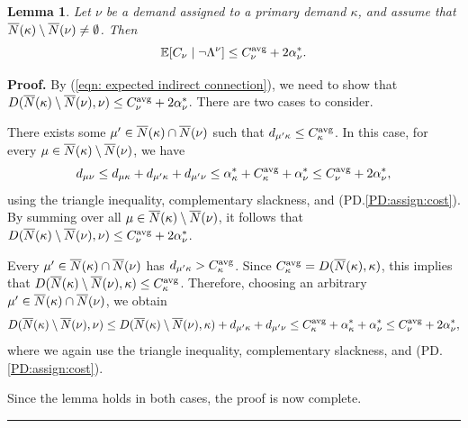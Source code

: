 \documentclass[oneside,final]{ucr}
\newtheorem{lemma}[theorem]{Lemma}
\newenvironment{proof}[1][Proof]{\textbf{#1.} }{\ \rule{0.5em}{0.5em}}
\begin{document}
\begin{lemma}
  \label{lem:echu indirect}
  Let $\nu$ be a demand assigned to a primary demand $\kappa$, and
assume that ${\overline{N}}(\kappa) \setminus {\overline{N}}(\nu)\neq\emptyset$.
Then 
%
\begin{equation*}
	\mathbb{E}[ C_\nu \mid\neg\Lambda^\nu]  \leq
  		C^{{\mbox{\scriptsize\rm avg}}}_\nu+2\alpha_{\nu}^\ast.
\end{equation*}
\end{lemma}
\begin{proof}
By (\ref{eqn: expected indirect connection}), we need to show that $D({\overline{N}}(\kappa)
  \setminus {\overline{N}}(\nu), \nu) \leq C^{{\mbox{\scriptsize\rm avg}}}_\nu +
  2\alpha_{\nu}^\ast$. There are two cases to consider.

\begin{description}
%	
\item{}
	 There exists some $\mu'\in {\overline{N}}(\kappa) \cap
  {\overline{N}}(\nu)$ such that $d_{\mu' \kappa} \leq C^{{\mbox{\scriptsize\rm avg}}}_\kappa$.
In this case, for every $\mu\in {\overline{N}}(\kappa)\setminus {\overline{N}}(\nu)$, we have
%
\begin{equation*}
d_{\mu \nu} \leq d_{\mu \kappa} + d_{\mu' \kappa} + d_{\mu' \nu}  
 	\le  \alpha^\ast_\kappa + C^{{\mbox{\scriptsize\rm avg}}}_\kappa + \alpha^\ast_{\nu}
  \leq C^{{\mbox{\scriptsize\rm avg}}}_\nu + 2\alpha_{\nu}^\ast,
\end{equation*}
%
using the triangle inequality, complementary slackness, and (PD.\ref{PD:assign:cost}).
By summing over all $\mu\in {\overline{N}}(\kappa) \setminus {\overline{N}}(\nu)$, it
follows that $D({\overline{N}}(\kappa) \setminus {\overline{N}}(\nu), \nu) \leq
C^{{\mbox{\scriptsize\rm avg}}}_\nu + 2\alpha_{\nu}^\ast$.

\item{}
 Every $\mu'\in {\overline{N}}(\kappa)\cap {\overline{N}}(\nu)$
has $d_{\mu'\kappa} > C^{{\mbox{\scriptsize\rm avg}}}_\kappa$. Since $C^{{\mbox{\scriptsize\rm avg}}}_{\kappa} = D({\overline{N}}(\kappa),\kappa)$,
this implies that
$D({\overline{N}}(\kappa) \setminus {\overline{N}}(\nu),\kappa)\leq C^{{\mbox{\scriptsize\rm avg}}}_{\kappa}$. Therefore,
choosing an arbitrary $\mu'\in {\overline{N}}(\kappa)\cap {\overline{N}}(\nu)$,
we obtain
%
\begin{equation*}
  D({\overline{N}}(\kappa) \setminus {\overline{N}}(\nu), \nu) 
	\leq  D({\overline{N}}(\kappa) \setminus {\overline{N}}(\nu), \kappa) 
			+ d_{\mu' \kappa} + d_{\mu' \nu} 
	\leq  C^{{\mbox{\scriptsize\rm avg}}}_{\kappa} +
  \alpha_{\kappa}^\ast + \alpha_{\nu}^\ast
	\leq C^{{\mbox{\scriptsize\rm avg}}}_\nu + 2\alpha_{\nu}^\ast,
\end{equation*}
%
where we again use the triangle inequality,
complementary slackness, and  (PD.\ref{PD:assign:cost}).
%
\end{description}
%
Since the lemma holds in both cases, the proof is now complete.
\end{proof}
\end{document}
